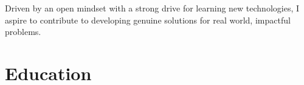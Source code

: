 \documentclass[a4paper,12pt]{article}
\begin{document}




Driven by an open mindset with a strong drive for learning new technologies, I aspire to contribute to developing genuine solutions for real world, impactful problems.



\section{Education}
\end{document}
